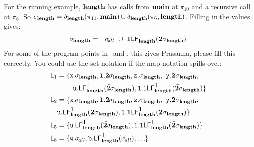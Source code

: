 \documentclass[9pt]{sigplanconf}
\begin{document}
For  the  running  example,   $\length$  has  calls  from  $\main$  at
$\pi_{10}$ and a recursive call at $\pi_6$.
So $\sigma_{\length} =
     \deltacall{\length}{\pi_{11}}{\main}  \cup
\deltacall{\length}{\pi_6}{\length}$.
Filling in  the values gives:
\begin{eqnarray*}
\sigma_{\length}    &=&
 \sigma_{\!all}  ~\cup~
\acdr\Lf{\length}{1}{\cbar\sigma_{\mathit{\length}}}
\end{eqnarray*}
For some of the program points in \length\  and \main,  this gives
{\color {red} Prasanna, please fill this correctly}. You could use the
set notation if the map notation spills over:
\begin{align*}
\Lan{1} &= \lbrace  \px.\sigma_{\length}, \xl.\cbar\sigma_{\length},
\pz.\sigma_{\length},\
              \py.\cbar\sigma_{\length}, \\
&~~~~~~~\pu.\Lf{\length}{\mbox{1}}{\cbar\sigma_{\length}},
\xl.\acdr\Lf{\length}{\mbox{1}}{\cbar\sigma_{\length}} \rbrace \\
\Lan{2} & =  \lbrace  \px.\sigma_{\length}, \xl.\cbar\sigma_{\length},
\pz.\sigma_{\length},\
                  \py.\cbar\sigma_{\length}, \\
&\pu.\Lf{\length}{\mbox{1}}{\cbar\sigma_{\length}},
\xl.\acdr\Lf{\length}{\mbox{1}}{\cbar\sigma_{\length}} \rbrace \\
\Lan{5} &= \lbrace \pu.\Lf{\length}{\mbox{1}}{\cbar\sigma_{\length}},
\xl.\acdr\Lf{\length}{\mbox{1}}{\cbar\sigma_{\length}}\rbrace \\
\Lan{8} &= \lbrace \pw.\sigma_{\mathit{\!all}},
\pb.\Lf{\length}{\mbox{1}}{\sigma_{\mathit{\!all}}}, \ldots  \rbrace
\end{align*}
\end{document}
